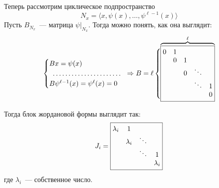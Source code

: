 \documentclass[12pt]{../../../notes}
\begin{document}
Теперь рассмотрим циклическое подпространство
\[
  N_x = \langle x, \psi(x), \dotsc, \psi^{\ell-1}(x) \rangle
\]
Пусть $B_{N_x}$~--- матрица $\psi \big\vert_{N_x}$. Тогда можно понять, как она выглядит:
\[
  \begin{cases}
    B x = \psi(x) &\\
    \hdotsfor{1} &\\
    B \psi^{\ell-1} (x) = \psi^\ell(x) = 0 &\\
  \end{cases}
  \Rightarrow
  B = \ell \left\{ \vphantom{ \begin{matrix}~ \\~ \\ ~ \\~ \\~ \\~\end{matrix} } \!\!\right.
  \overbrace{
    \boxed{
      \begin{matrix}
        0 & 1 & ~ & ~ & ~ \\
        ~ & 0 & 1 & ~ & ~ \\
        ~ & ~ & 0 & \ddots & ~ \\
        ~ & ~ & ~ & \ddots & 1 \\
        ~ & ~ & ~ & ~ & 0 
      \end{matrix}
    }
  }^\ell
\]

Тогда блок жордановой формы выглядит так:
\[
    J_i = \boxed{\begin{matrix}
          \lambda_i & 1 & ~ & ~ \cr
          ~ & \lambda_i & \ddots & ~ \cr
          ~ & ~ & \ddots & 1 \cr
          ~ & ~ & ~ & \lambda_i \cr
      \end{matrix}}
\]
где $\lambda_i$~--- собственное число.
\end{document}
